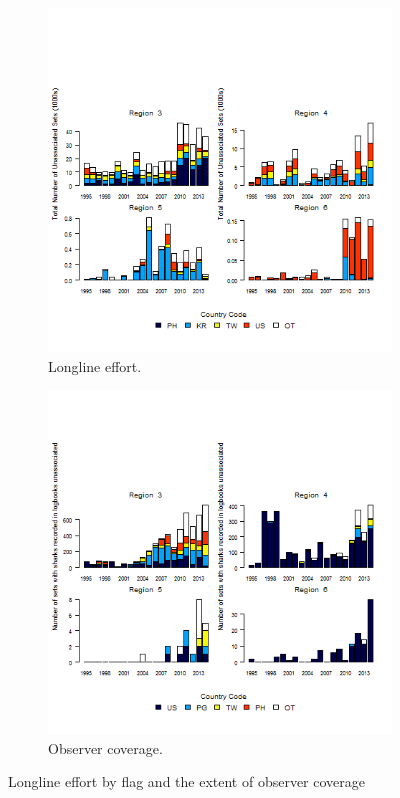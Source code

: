 \documentclass[12pt]{SCreport}
\begin{document}
\begin{landscape}
\begin{figure}
   \begin{subfigure}[b]{0.49\textwidth}
       \includegraphics[width=\textwidth]{../GRAPHICS/Defined/FIG_08c_ps_total_effUnassociated}
       \caption{Longline effort.}
       \label{fig:test1}
   \end{subfigure}
   \begin{subfigure}[b]{0.49\textwidth}
       \includegraphics[width=\textwidth]{../GRAPHICS/Defined/FIG_08d_ps_oper_shks_rep_cntry_unassociated}
       \caption{Observer coverage.}
       \label{fig:test2}
   \end{subfigure}
\caption{Longline effort by flag and the extent of observer coverage}
\label{fig:fig08} 
\end{figure}
\end{landscape}
\end{document}
